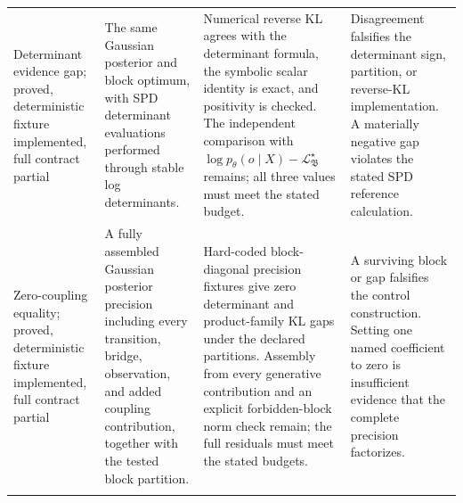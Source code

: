\begin{longtable}{>{\raggedright\arraybackslash}p{}>{\raggedright\arraybackslash}p{}>{\raggedright\arraybackslash}p{}>{\raggedright\arraybackslash}p{}}
\addlinespace
Determinant evidence gap; proved, deterministic fixture implemented, full contract partial & The same Gaussian posterior and block optimum, with SPD determinant evaluations performed through stable log determinants. & Numerical reverse KL agrees with the determinant formula, the symbolic scalar identity is exact, and positivity is checked. The independent comparison with \(\log p_\theta(o\mid X)-\mathcal L_{\mathfrak B}^\star\) remains; all three values must meet the stated budget. & Disagreement falsifies the determinant sign, partition, or reverse-KL implementation. A materially negative gap violates the stated SPD reference calculation. \\
\addlinespace
Zero-coupling equality; proved, deterministic fixture implemented, full contract partial & A fully assembled Gaussian posterior precision including every transition, bridge, observation, and added coupling contribution, together with the tested block partition. & Hard-coded block-diagonal precision fixtures give zero determinant and product-family KL gaps under the declared partitions. Assembly from every generative contribution and an explicit forbidden-block norm check remain; the full residuals must meet the stated budgets. & A surviving block or gap falsifies the control construction. Setting one named coefficient to zero is insufficient evidence that the complete precision factorizes. \\
\addlinespace

\end{longtable}
